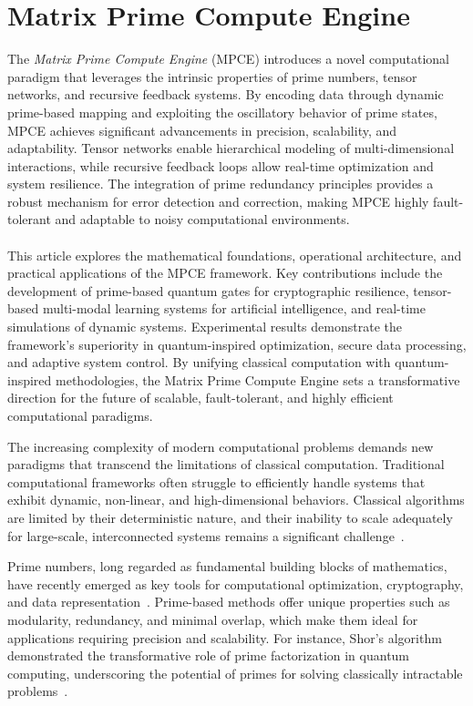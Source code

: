 \documentclass{article}
\theoremstyle{plain}
\begin{document}
\section{Matrix Prime Compute Engine}
The \textit{Matrix Prime Compute Engine} (MPCE) introduces a novel computational paradigm that leverages the intrinsic properties of prime numbers, tensor networks, and recursive feedback systems. By encoding data through dynamic prime-based mapping and exploiting the oscillatory behavior of prime states, MPCE achieves significant advancements in precision, scalability, and adaptability. Tensor networks enable hierarchical modeling of multi-dimensional interactions, while recursive feedback loops allow real-time optimization and system resilience. The integration of prime redundancy principles provides a robust mechanism for error detection and correction, making MPCE highly fault-tolerant and adaptable to noisy computational environments.
\paragraph{} This article explores the mathematical foundations, operational architecture, and practical applications of the MPCE framework. Key contributions include the development of prime-based quantum gates for cryptographic resilience, tensor-based multi-modal learning systems for artificial intelligence, and real-time simulations of dynamic systems. Experimental results demonstrate the framework's superiority in quantum-inspired optimization, secure data processing, and adaptive system control. By unifying classical computation with quantum-inspired methodologies, the Matrix Prime Compute Engine sets a transformative direction for the future of scalable, fault-tolerant, and highly efficient computational paradigms.

The increasing complexity of modern computational problems demands new paradigms that transcend the limitations of classical computation. Traditional computational frameworks often struggle to efficiently handle systems that exhibit dynamic, non-linear, and high-dimensional behaviors. Classical algorithms are limited by their deterministic nature, and their inability to scale adequately for large-scale, interconnected systems remains a significant challenge~\cite{hardy2008introduction, feynman2010quantum}.

Prime numbers, long regarded as fundamental building blocks of mathematics, have recently emerged as key tools for computational optimization, cryptography, and data representation~\cite{riemann1859hypothesis, shor1994algorithms}. Prime-based methods offer unique properties such as modularity, redundancy, and minimal overlap, which make them ideal for applications requiring precision and scalability. For instance, Shor's algorithm demonstrated the transformative role of prime factorization in quantum computing, underscoring the potential of primes for solving classically intractable problems~\cite{shor1994algorithms}.
\end{document}
